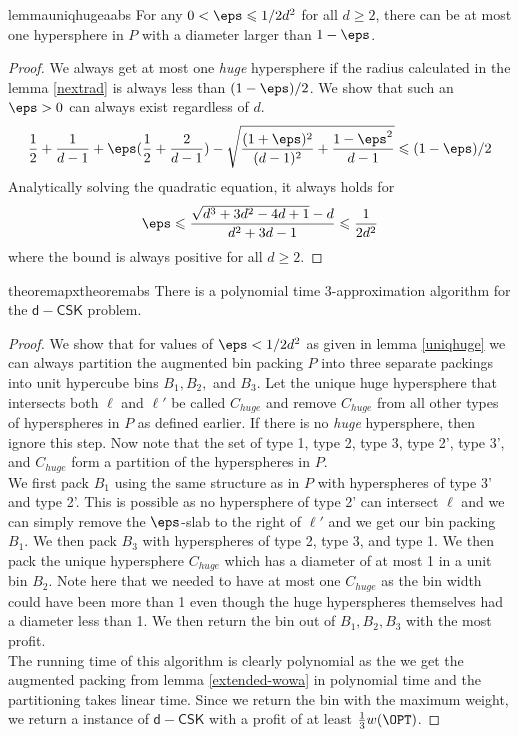 \begin{restatable}{lemma}{uniqhugeaabs}
	\label{uniqhuge}
	For any $0 < \eps \leqslant 1/2d^2$ for all $d \geqslant 2$, there can be at most one hypersphere in $P$ with a diameter larger than $1-\eps$.
\end{restatable}
\begin{proof}
	We always get at most one \textit{huge} hypersphere if the radius calculated in the lemma \ref{nextrad} is always less than $(1-\eps)/2$. We show that such an $\eps>0$ can always exist regardless of $d$.
	\[\frac{1}{2}+\frac{1}{d-1}+\eps( \frac{1}{2} + \frac{2}{d-1}) -\sqrt{\frac{(1+\eps)^2}{(d-1)^2}+\frac{1-\eps^2}{d-1}} \leqslant (1-\eps)/2 \]
	Analytically solving the quadratic equation, it always holds for \[\eps \leqslant \frac{\sqrt{d^3+3d^2-4d+1}-d}{d^2+3d-1} \leqslant \frac{1}{2d^2}\] where the bound is always positive for all $d \geqslant 2$.
\end{proof}

\begin{restatable}{theorem}{apxtheoremabs}
	\label{3apx}
	There is a polynomial time $3$-approximation algorithm for the $\mathsf{d-CSK}$ problem.
\end{restatable}
\begin{proof}
	We show that for values of $\eps<1/2d^2$ as given in lemma \ref{uniqhuge} we can always partition the augmented bin packing $P$ into three separate packings into unit hypercube bins $B_1, B_2,$ and $B_3$. Let the unique huge hypersphere that intersects both $\ell$ and $\ell'$ be called $C_{huge}$ and remove $C_{huge}$ from all other types of hyperspheres in $P$ as defined earlier. If there is no \textit{huge} hypersphere, then ignore this step. Now note that the set of type 1, type 2, type 3, type 2', type 3', and $C_{huge}$ form a partition of the hyperspheres in $P$.  
	\\We first pack $B_1$ using the same structure as in $P$ with hyperspheres of type 3' and type 2'. This is possible as no hypersphere of type 2' can intersect $\ell$ and we can simply remove the $\eps$-slab to the right of $\ell'$ and we get our bin packing $B_1$. We then pack $B_3$ with hyperspheres of type 2, type 3, and type 1. We then pack the unique hypersphere $C_{huge}$ which has a diameter of at most 1 in a unit bin $B_2$. Note here that we needed to have at most one $C_{huge}$ as the bin width could have been more than 1 even though the huge hyperspheres themselves had a diameter less than 1. We then return the bin out of $B_1, B_2, B_3$ with the most profit.
	\\The running time of this algorithm is clearly polynomial as the we get the augmented packing from lemma \ref{extended-wowa} in polynomial time and the partitioning takes linear time. 
	 Since we return the bin with the maximum weight, we return a instance of $\mathsf{d-CSK}$ with a profit of at least $\frac{1}{3} w(\OPT)$. 
\end{proof}

